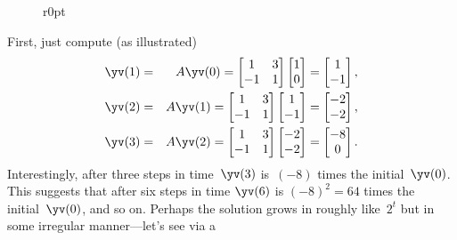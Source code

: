 \begin{example}
\begin{solution} 
\begin{figure}[4]r{0pt}
\end{figure}
First, just compute (as illustrated)
\begin{eqnarray*}
\yv(1)&=&A\yv(0)=\begin{bmatrix} 1&3\\-1&1 \end{bmatrix}
\begin{bmatrix} 1\\0 \end{bmatrix}
=\begin{bmatrix} 1\\-1 \end{bmatrix},
\\\yv(2)&=&A\yv(1)=\begin{bmatrix} 1&3\\-1&1 \end{bmatrix}
\begin{bmatrix} 1\\-1 \end{bmatrix}
=\begin{bmatrix} -2\\-2 \end{bmatrix},
\\\yv(3)&=&A\yv(2)=\begin{bmatrix} 1&3\\-1&1 \end{bmatrix}
\begin{bmatrix} -2\\-2 \end{bmatrix}
=\begin{bmatrix} -8\\0 \end{bmatrix}.
\end{eqnarray*}
Interestingly, after three steps in time~\(\yv(3)\) is~\((-8)\) times the initial~\(\yv(0)\).
This suggests that after six steps in time \(\yv(6)\) is \((-8)^2=64\) times the initial~\(\yv(0)\), and so on.
Perhaps the solution grows in  roughly like~\(2^t\) but in some irregular manner---let's see via a 


\end{solution}
\end{example}
